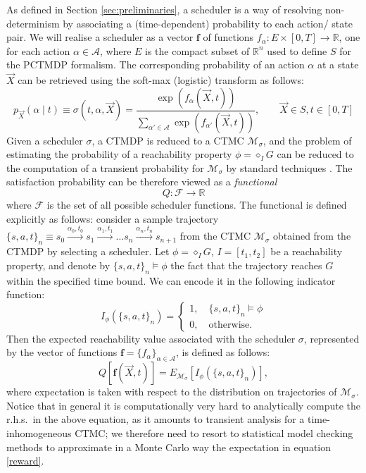 As defined in Section \ref{sec:preliminaries}, a scheduler is a way of resolving non-determinism by associating a (time-dependent) probability to each action/ state pair. 
We will realise a scheduler as a vector $\mathbf{f}$ of  functions $f_{\alpha}: E \times [0,T] \rightarrow \mathbb{R}$, one for each action $\alpha \in \mathcal{A}$, where $E$ is the compact subset of $\mathbb{R}^n$ used to define $S$ for the PCTMDP formalism. The corresponding probability of an action $\alpha$ at a state $\vec{X}$ can be retrieved using the soft-max (logistic) transform as follows:
\begin{equation}
p_{\vec{X}}(\alpha \mid t) \equiv \sigma(t,\alpha,\vec{X}) = \frac{\exp(f_{\alpha}(\vec{X}, t))}{\sum_{\alpha' \in \mathcal{A}} \exp(f_{\alpha'}(\vec{X}, t))}, \qquad \vec{X} \in S, t\in [0,T]
\end{equation}
Given a scheduler $\sigma$, a CTMDP is reduced  to a CTMC $\mathcal{M}_{\sigma}$, and the problem of estimating the probability of a reachability property $\phi = \diamond_I G$ can be reduced to the computation of a transient probability for $\mathcal{M}_{\sigma}$ by standard techniques \cite{Baier2003}.
The satisfaction probability can be therefore viewed as a {\it functional} 
\[
Q\colon\mathcal{F}\rightarrow\mathbb{R}
\]
where $\mathcal{F}$ is the set of all possible scheduler functions.
The functional is defined explicitly as follows: consider a sample trajectory $\{s, a, t\}_n \equiv s_0\xrightarrow{\alpha_0,t_0}s_1\xrightarrow{\alpha_1,t_1}\ldots s_n\xrightarrow{\alpha_n,t_n}s_{n+1}$ from the CTMC $\mathcal{M}_{\sigma}$ obtained from the CTMDP by selecting a scheduler. Let $\phi= \diamond_I G$, $I=[t_1,t_2]$ be a reachability property, and denote by $ \{s, a, t\}_n \models \phi$ the fact that the trajectory reaches $G$ within the specified time bound. We can encode it in the following indicator function:
\begin{equation}
I_{\phi}(\{s, a, t\}_n) = 
\begin{cases}
1, \quad \{s, a, t\}_n \models \phi \\
0, \quad \mathrm{otherwise}.
\end{cases}
\end{equation}
Then the expected reachability value associated with the scheduler $\sigma$, represented by the vector of functions $\mathbf{f}=\{ f_\alpha\}_{\alpha\in\mathcal{A}}$, is defined as follows:
\begin{equation}
Q\left[\mathbf{f}(\vec{X}, t)\right]=E_{\mathcal{M}_{\sigma}}\left[I_{\phi}(\{s, a, t\}_n)\right],
\label{reward}
\end{equation}
where expectation is taken with respect to the distribution on trajectories of $\mathcal{M}_{\sigma}$.
Notice that in general it is computationally very hard to analytically compute the r.h.s.\ in the above equation, as it amounts to transient analysis for a time-inhomogeneous CTMC; we therefore need to resort to statistical model checking methods \cite{SB:Zuliani:2009:StatMC,MC:YounesSimmons:INFCOMP2006:statMC} to approximate in a Monte Carlo way the expectation in equation \eqref{reward}.

